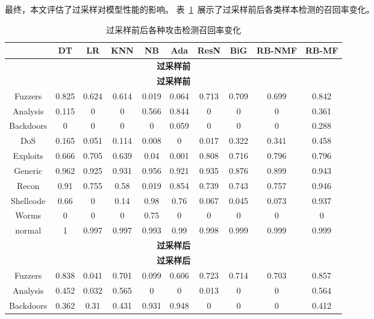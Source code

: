 最终，本文评估了过采样对模型性能的影响。
表~\ref{tab:model_performance_oversampling}~展示了过采样前后各类样本检测的召回率变化。
\begin{table}[htbp]
	\centering
	\caption{过采样前后各种攻击检测召回率变化}
	\label{tab:model_performance_oversampling}
	\begin{tabular}{cccccccccc}
		\toprule
		          & DT    & LR    & KNN   & NB    & Ada   & ResN  & BiG   & RB-NMF & RB-MF \\
		\midrule
		\multicolumn{10}{c}{\textbf{过采样前}}                                             \\
		\multicolumn{10}{c}{\textbf{过采样前}}                                             \\
		Fuzzers   & 0.825 & 0.624 & 0.614 & 0.019 & 0.064 & 0.713 & 0.709 & 0.699  & 0.842 \\
		Analysis  & 0.115 & 0     & 0     & 0.566 & 0.844 & 0     & 0     & 0      & 0.361 \\
		Backdoors & 0     & 0     & 0     & 0     & 0.059 & 0     & 0     & 0      & 0.288 \\
		DoS       & 0.165 & 0.051 & 0.114 & 0.008 & 0     & 0.017 & 0.322 & 0.341  & 0.458 \\
		Exploits  & 0.666 & 0.705 & 0.639 & 0.04  & 0.001 & 0.808 & 0.716 & 0.796  & 0.796 \\
		Generic   & 0.962 & 0.925 & 0.931 & 0.956 & 0.921 & 0.935 & 0.876 & 0.899  & 0.943 \\
		Recon     & 0.91  & 0.755 & 0.58  & 0.019 & 0.854 & 0.739 & 0.743 & 0.757  & 0.946 \\
		Shellcode & 0.66  & 0     & 0.14  & 0.98  & 0.76  & 0.067 & 0.045 & 0.073  & 0.937 \\
		Worms     & 0     & 0     & 0     & 0.75  & 0     & 0     & 0     & 0      & 0     \\
		normal    & 1     & 0.997 & 0.997 & 0.993 & 0.99  & 0.998 & 0.999 & 0.999  & 0.999 \\
		\midrule
		\multicolumn{10}{c}{\textbf{过采样后}}                                             \\
		\multicolumn{10}{c}{\textbf{过采样后}}                                             \\
		Fuzzers   & 0.838 & 0.041 & 0.701 & 0.099 & 0.606 & 0.723 & 0.714 & 0.703  & 0.857 \\
		Analysis  & 0.452 & 0.032 & 0.565 & 0     & 0     & 0.013 & 0     & 0      & 0.564 \\
		Backdoors & 0.362 & 0.31  & 0.431 & 0.931 & 0.948 & 0     & 0     & 0      & 0.412 \\

\end{tabular}
\end{table}
